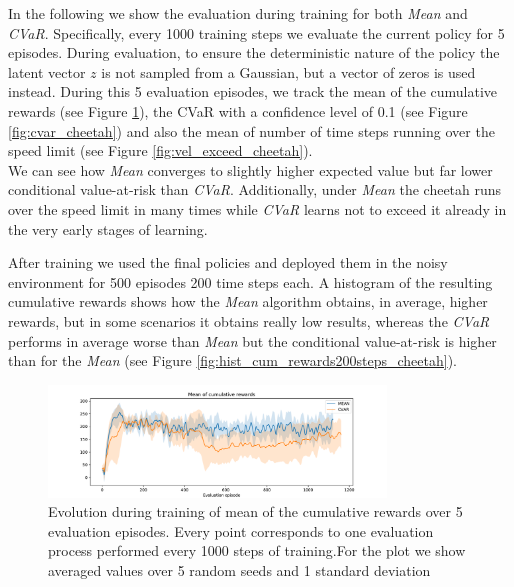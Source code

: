 In the following we show the evaluation during training for both \textit{Mean} and
\textit{CVaR}.
Specifically, every 1000 training steps we evaluate the current policy for 5 episodes.
During evaluation, to ensure the deterministic nature of the policy
the latent vector $z$ is not sampled from a Gaussian, but a vector of zeros is used instead.
During this 5 evaluation episodes, we track the mean of the cumulative rewards (see Figure \ref{fig:mean_cheetah}),
the CVaR with a confidence level of 0.1 (see Figure \ref{fig:cvar_cheetah}) and also the 
mean of number of time steps running over the speed limit (see Figure \ref{fig:vel_exceed_cheetah}).\\
We can see how \textit{Mean} converges to slightly higher
expected value but far lower conditional value-at-risk than \textit{CVaR}.
Additionally, under \textit{Mean} the cheetah runs over the speed limit in many times
while \textit{CVaR} learns not to exceed it already
in the very early stages of learning.

After training we used the final policies and deployed them in the noisy environment for 500 episodes 
200 time steps each. A histogram of the resulting cumulative rewards shows
how the \textit{Mean} algorithm obtains, in average, higher rewards, but in some scenarios it 
obtains really low results, whereas the \textit{CVaR} performs in average worse than \textit{Mean} 
but the conditional value-at-risk is higher than for the \textit{Mean} (see Figure \ref{fig:hist_cum_rewards200steps_cheetah}).



\begin{figure}[ht]
    \centering
    \includegraphics[width=0.8\textwidth]{images/Cheetah_offpolicy_medium/mean_train_withstds.pdf}
    \caption{Evolution during training of mean of the cumulative rewards over 5 evaluation episodes. Every point corresponds
    to one evaluation process performed every 1000 steps of training.For the plot we
    show averaged values over 5 random seeds and 1 standard deviation}
    \label{fig:mean_cheetah}

\end{figure}

